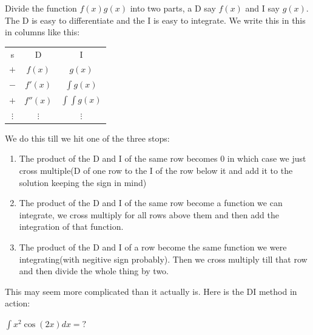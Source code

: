 \begin{theorem}
    Divide the function $f(x)g(x)$ into two parts, a D say $f(x)$ and I say $g(x)$. The D is easy to differentiate and the I is easy to integrate. We write this in this in columns like this:\\
    \begin{table}[ht]
        \centering
        \begin{tabular}{c|c|c|}
            s & D & I\\
            $+$ & $f(x)$ & $g(x)$\\
            $-$ & $f'(x)$ & $\int g(x)$\\
            $+$ & $f''(x)$ & $\int \int g(x)$\\
            $\vdots$ & $\vdots$ & $\vdots$\\
        \end{tabular}
    \end{table}
    We do this till we hit one of the three stops:\\
    \begin{enumerate}
        \item The product of the D and I of the same row becomes $0$ in which case we just cross multiple(D of one row to the I of the row below it and add it to the solution keeping the sign in mind)\\
        \item The product of the D and I of the same row become a function we can integrate, we cross multiply for all rows above them and then add the integration of that function.\\
        \item The product of the D and I of a row become the same function we were integrating(with negitive sign probably). Then we cross multiply till that row and then divide the whole thing by two.
    \end{enumerate}
\end{theorem}
This may seem more complicated than it actually is. Here is the DI method in action:\\
\begin{example}
    $\int x^2 \cos(2x)dx=?$
\end{example}
